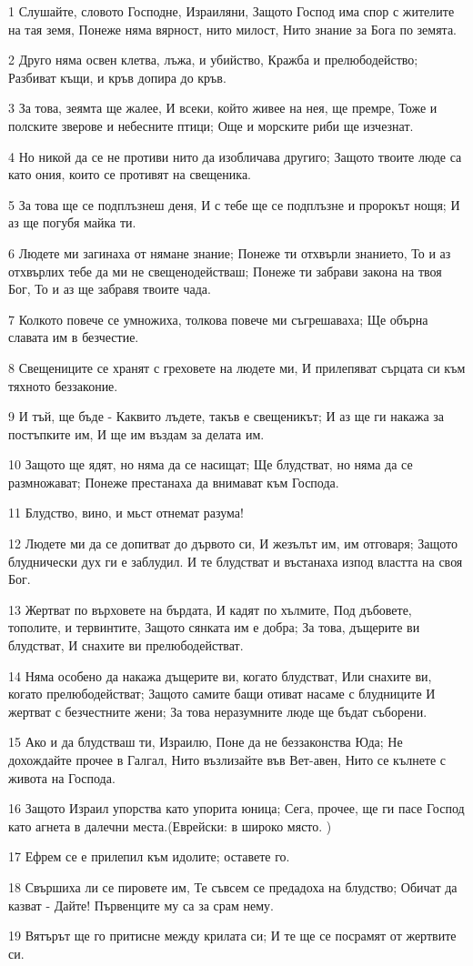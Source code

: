 \par 1 Слушайте, словото Господне, Израиляни, Защото Господ има спор с жителите на тая земя, Понеже няма вярност, нито милост, Нито знание за Бога по земята.
\par 2 Друго няма освен клетва, лъжа, и убийство, Кражба и прелюбодейство; Разбиват къщи, и кръв допира до кръв.
\par 3 За това, зеямта ще жалее, И всеки, който живее на нея, ще премре, Тоже и полските зверове и  небесните птици; Още и морските риби ще изчезнат.
\par 4 Но никой да се не противи нито да изобличава другиго; Защото твоите люде са като ония, които се противят на свещеника.
\par 5 За това ще се подплъзнеш деня, И с тебе ще се подплъзне и пророкът нощя; И аз ще погубя майка ти.
\par 6 Людете ми загинаха от нямане знание; Понеже ти отхвърли знанието, То и аз отхвърлих тебе да ми не свещенодействаш; Понеже ти забрави закона на твоя Бог, То и аз ще забравя твоите чада.
\par 7 Колкото повече се умножиха, толкова повече ми съгрешаваха; Ще обърна славата им в безчестие.
\par 8 Свещениците  се хранят с греховете на людете ми, И прилепяват сърцата си към тяхното беззаконие.
\par 9 И тъй, ще бъде - Каквито лъдете, такъв е свещеникът; И аз ще ги накажа за постъпките им, И ще им въздам за делата им.
\par 10 Защото ще ядят, но няма да се насищат; Ще блудстват, но няма да се размножават; Понеже престанаха да внимават към Господа.
\par 11 Блудство, вино, и мьст отнемат разума!
\par 12 Людете ми да се допитват до дървото си,  И жезълът им, им отговаря; Защото блуднически дух ги е заблудил. И те блудстват и въстанаха  изпод  властта на своя Бог.
\par 13 Жертват по върховете на бърдата, И кадят по хълмите, Под дъбовете, тополите, и тервинтите, Защото сянката им е добра; За това, дъщерите ви блудстват, И снахите ви прелюбодействат.
\par 14 Няма особено  да накажа дъщерите ви, когато блудстват, Или снахите ви, когато  прелюбодействат; Защото самите бащи отиват насаме с блудниците И жертват с безчестните жени; За това неразумните люде ще бъдат съборени.
\par 15 Ако и да блудстваш ти, Израилю, Поне да не беззаконства Юда; Не дохождайте прочее в Галгал, Нито възлизайте във Вет-авен, Нито се кълнете с живота на Господа.
\par 16 Защото Израил упорства като упорита юница; Сега, прочее, ще ги пасе Господ като агнета в далечни места.(Еврейски: в широко място. )
\par 17 Ефрем се е прилепил към идолите; оставете го.
\par 18 Свършиха ли се пировете им, Те съвсем се предадоха на блудство; Обичат да казват - Дайте! Първенците му са за срам нему.
\par 19 Вятърът ще го притисне между крилата си; И те ще се посрамят от жертвите си.

